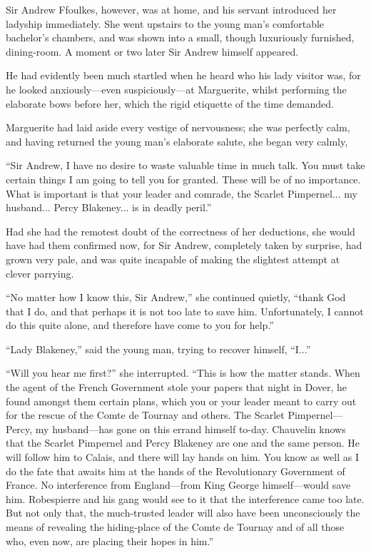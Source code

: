 Sir Andrew Ffoulkes, however, was at home, and his servant introduced her ladyship immediately. She went upstairs to the young man's comfortable bachelor's chambers, and was shown into a small, though luxuriously furnished, dining-room. A moment or two later Sir Andrew himself appeared.

He had evidently been much startled when he heard who his lady visitor was, for he looked anxiously---even suspiciously---at Marguerite, whilst performing the elaborate bows before her, which the rigid etiquette of the time demanded.

Marguerite had laid aside every vestige of nervousness; she was perfectly calm, and having returned the young man's elaborate salute, she began very calmly,\longdash


\enquote{Sir Andrew, I have no desire to waste valuable time in much talk. You must take certain things I am going to tell you for granted. These will be of no importance. What is important is that your leader and comrade, the Scarlet Pimpernel... my husband... Percy Blakeney... is in deadly peril.}

Had she had the remotest doubt of the correctness of her deductions, she would have had them confirmed now, for Sir Andrew, completely taken by surprise, had grown very pale, and was quite incapable of making the slightest attempt at clever parrying.

\enquote{No matter how I know this, Sir Andrew,} she continued quietly, \enquote{thank God that I do, and that perhaps it is not too late to save him. Unfortunately, I cannot do this quite alone, and therefore have come to you for help.}

\enquote{Lady Blakeney,} said the young man, trying to recover himself, \enquote{I...}

\enquote{Will you hear me first?} she interrupted. \enquote{This is how the matter stands. When the agent of the French Government stole your papers that night in Dover, he found amongst them certain plans, which you or your leader meant to carry out for the rescue of the Comte de Tournay and others. The Scarlet Pimpernel---Percy, my husband---has gone on this errand himself to-day. Chauvelin knows that the Scarlet Pimpernel and Percy Blakeney are one and the same person. He will follow him to Calais, and there will lay hands on him. You know as well as I do the fate that awaits him at the hands of the Revolutionary Government of France. No interference from England---from King George himself---would save him. Robespierre and his gang would see to it that the interference came too late. But not only that, the much-trusted leader will also have been unconsciously the means of revealing the hiding-place of the Comte de Tournay and of all those who, even now, are placing their hopes in him.}

